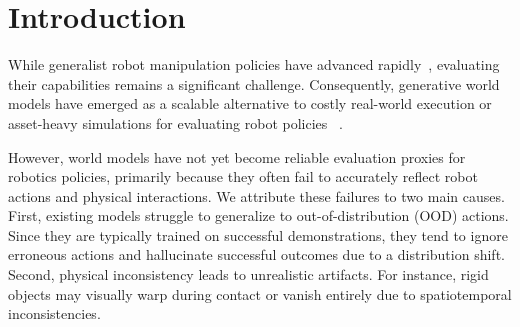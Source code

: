 \section{Introduction}
While generalist robot manipulation policies have advanced rapidly~\citep{[pi0, rt-2, kim24openvla, hu2023look, liu2025hybridvla, intelligence2025pi_, kim2025openvlaoft, team2025gemini, bjorck2025gr00t, zhao2025cot-vla, zhao2025vlas, zhen20243d}, evaluating their capabilities remains a significant challenge. 
Consequently, generative world models have emerged as a scalable alternative to costly real-world execution or asset-heavy simulations for evaluating robot policies
~\cite{li2025worldeval,guo2025ctrl,quevedo2506worldgym,team2025evaluating,ho20251x,huang2025enerverse,jiang2025enerverse,tseng2025scalable}.

However, world models have not yet become reliable evaluation proxies for robotics policies, primarily because they often fail to accurately reflect robot actions and physical interactions. We attribute these failures to two main causes. First, existing models struggle to generalize to out-of-distribution (OOD) actions. Since they are typically trained on successful demonstrations, they tend to ignore erroneous actions and hallucinate successful outcomes due to a distribution shift. Second, physical inconsistency leads to unrealistic artifacts. For instance, rigid objects may visually warp during contact or vanish entirely due to spatiotemporal inconsistencies.









